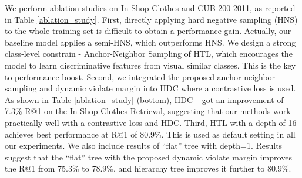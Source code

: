 \documentclass[runningheads]{llncs}
\begin{document}
We perform ablation studies on In-Shop Clothes and CUB-200-2011, as reported in Table \ref{ablation_study}. First, directly applying hard negative sampling (HNS) to the whole training set is difficult to obtain a performance gain. Actually, our baseline model applies a semi-HNS, which outperforms HNS.
We design a strong class-level constrain - Anchor-Neighbor Sampling of HTL, which encourages the model to learn discriminative features from visual similar classes. This is the key to performance boost. Second, we integrated the proposed anchor-neighbor sampling and dynamic violate margin into HDC  where a contrastive loss is used. As shown in Table \ref{ablation_study} (bottom), HDC+ got an improvement of 7.3\% R@1 on the In-Shop Clothes Retrieval, suggesting that our methods work practically well with a contrastive loss and HDC. Third, HTL with a depth of 16 achieves best performance at R@1 of 80.9\%. This is used as default setting in all our experiments. We also include results of ``flat'' tree with depth=1. Results suggest that the ``flat'' tree with the proposed dynamic violate margin improves the R@1 from 75.3\% to 78.9\%, and hierarchy tree improves it further to 80.9\%. \\
~\vspace{-8mm}
\end{document}
